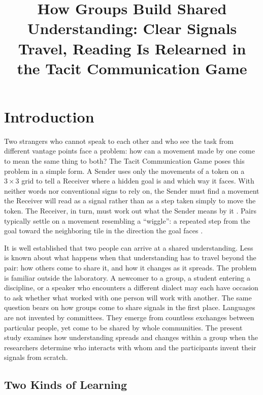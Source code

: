 \documentclass[stu,11pt,floatsintext,donotrepeattitle]{apa7}
\title{How Groups Build Shared Understanding: Clear Signals Travel, Reading Is Relearned in the Tacit Communication Game}
\begin{document}
\maketitle

\section{Introduction}

Two strangers who cannot speak to each other and who see the task from different vantage points face a problem: how can a movement made by one come to mean the same thing to both? The Tacit Communication Game \parencite[TCG;][]{deruiter2010} poses this problem in a simple form. A Sender uses only the movements of a token on a $3 \times 3$ grid to tell a Receiver where a hidden goal is and which way it faces. With neither words nor conventional signs to rely on, the Sender must find a movement the Receiver will read as a signal rather than as a step taken simply to move the token. The Receiver, in turn, must work out what the Sender means by it \parencite{stolk2016}. Pairs typically settle on a movement resembling a \enquote{wiggle}: a repeated step from the goal toward the neighboring tile in the direction the goal faces \parencite{blokpoel2012}.

It is well established that two people can arrive at a shared understanding. Less is known about what happens when that understanding has to travel beyond the pair: how others come to share it, and how it changes as it spreads. The problem is familiar outside the laboratory. A newcomer to a group, a student entering a discipline, or a speaker who encounters a different dialect may each have occasion to ask whether what worked with one person will work with another. The same question bears on how groups come to share signals in the first place. Languages are not invented by committees. They emerge from countless exchanges between particular people, yet come to be shared by whole communities. The present study examines how understanding spreads and changes within a group when the researchers determine who interacts with whom and the participants invent their signals from scratch.

\subsection{Two Kinds of Learning}
\end{document}
